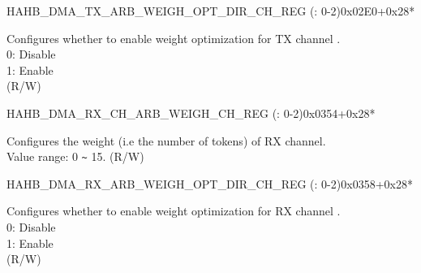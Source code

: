 \begin{register}{H}{AHB\_DMA\_TX\_ARB\_WEIGH\_OPT\_DIR\_CH\_REG (: 0-2)}{0x02E0+0x28*}\label{regdesc:AHBDMATXARBWEIGHOPTDIRCHNREG}
%
%
\regnewline%
\begin{regdesc}\begin{reglist}
\label{fielddesc:AHBDMATXARBWEIGHOPTDIRCHN}\item [AHB\_DMA\_TX\_ARB\_WEIGH\_OPT\_DIR\_CH\regindex{n}] Configures whether to enable weight optimization for TX channel .\\
0: Disable\\
1: Enable\\ (R/W)
\end{reglist}\end{regdesc}
\end{register}


\begin{register}{H}{AHB\_DMA\_RX\_CH\_ARB\_WEIGH\_CH\_REG (: 0-2)}{0x0354+0x28*}\label{regdesc:AHBDMARXCHARBWEIGHCHNREG}
%
%
\regnewline%
\begin{regdesc}\begin{reglist}
\label{fielddesc:AHBDMARXCHARBWEIGHCHN}\item [AHB\_DMA\_RX\_CH\_ARB\_WEIGH\_CH\regindex{n}] Configures the weight (i.e the number of tokens) of RX channel. \\Value range: 0 \verb+~+ 15. (R/W)
\end{reglist}\end{regdesc}
\end{register}


\begin{register}{H}{AHB\_DMA\_RX\_ARB\_WEIGH\_OPT\_DIR\_CH\_REG (: 0-2)}{0x0358+0x28*}\label{regdesc:AHBDMARXARBWEIGHOPTDIRCHNREG}
%
%
\regnewline%
\begin{regdesc}\begin{reglist}
\label{fielddesc:AHBDMARXARBWEIGHOPTDIRCHN}\item [AHB\_DMA\_RX\_ARB\_WEIGH\_OPT\_DIR\_CH\regindex{n}] Configures whether to enable weight optimization for RX channel .\\
0: Disable\\
1: Enable\\ (R/W)
\end{reglist}\end{regdesc}
\end{register}


